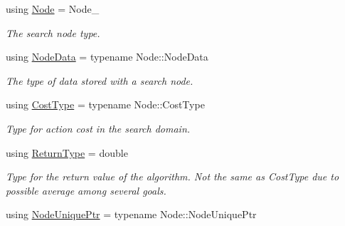 \begin{DoxyCompactItemize}
\item 
using \hyperlink{structslb_1_1ext_1_1algorithm_1_1BaseTraits_a4413b287fe7e24a87b1b6bc1bbf5c381}{Node} = Node\+\_\+\hypertarget{structslb_1_1ext_1_1algorithm_1_1BaseTraits_a4413b287fe7e24a87b1b6bc1bbf5c381}{}\label{structslb_1_1ext_1_1algorithm_1_1BaseTraits_a4413b287fe7e24a87b1b6bc1bbf5c381}

\begin{DoxyCompactList}\small\item\em The search node type. \end{DoxyCompactList}\item 
using \hyperlink{structslb_1_1ext_1_1algorithm_1_1BaseTraits_aae4df3d5b38adfe46ebaf725cdaa8399}{Node\+Data} = typename Node\+::\+Node\+Data\hypertarget{structslb_1_1ext_1_1algorithm_1_1BaseTraits_aae4df3d5b38adfe46ebaf725cdaa8399}{}\label{structslb_1_1ext_1_1algorithm_1_1BaseTraits_aae4df3d5b38adfe46ebaf725cdaa8399}

\begin{DoxyCompactList}\small\item\em The type of data stored with a search node. \end{DoxyCompactList}\item 
using \hyperlink{structslb_1_1ext_1_1algorithm_1_1BaseTraits_acde714a3e4695d137190ac4fc7e600c1}{Cost\+Type} = typename Node\+::\+Cost\+Type\hypertarget{structslb_1_1ext_1_1algorithm_1_1BaseTraits_acde714a3e4695d137190ac4fc7e600c1}{}\label{structslb_1_1ext_1_1algorithm_1_1BaseTraits_acde714a3e4695d137190ac4fc7e600c1}

\begin{DoxyCompactList}\small\item\em Type for action cost in the search domain. \end{DoxyCompactList}\item 
using \hyperlink{structslb_1_1ext_1_1algorithm_1_1BaseTraits_ab054296973909aa6bfbe407943f58938}{Return\+Type} = double\hypertarget{structslb_1_1ext_1_1algorithm_1_1BaseTraits_ab054296973909aa6bfbe407943f58938}{}\label{structslb_1_1ext_1_1algorithm_1_1BaseTraits_ab054296973909aa6bfbe407943f58938}

\begin{DoxyCompactList}\small\item\em Type for the return value of the algorithm. Not the same as Cost\+Type due to possible average among several goals. \end{DoxyCompactList}\item 
using \hyperlink{structslb_1_1ext_1_1algorithm_1_1BaseTraits_ab835ffb47510407b9ee0c84e1c4f92a9}{Node\+Unique\+Ptr} = typename Node\+::\+Node\+Unique\+Ptr\hypertarget{structslb_1_1ext_1_1algorithm_1_1BaseTraits_ab835ffb47510407b9ee0c84e1c4f92a9}{}\label{structslb_1_1ext_1_1algorithm_1_1BaseTraits_ab835ffb47510407b9ee0c84e1c4f92a9}


\end{DoxyCompactItemize}
